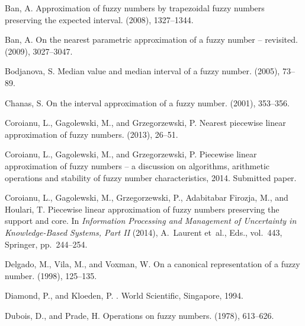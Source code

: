 \documentclass[11pt]{article}\usepackage[]{graphicx}\usepackage[]{color}
\begin{document}
\begin{thebibliography}{10}

{\sc Ban, A.}
\newblock Approximation of fuzzy numbers by trapezoidal fuzzy numbers
  preserving the expected interval.
 (2008), 1327--1344.

{\sc Ban, A.}
\newblock On the nearest parametric approximation of a fuzzy number --
  revisited.
 (2009), 3027--3047.

{\sc Bodjanova, S.}
\newblock Median value and median interval of a fuzzy number.
 (2005), 73--89.

{\sc Chanas, S.}
\newblock On the interval approximation of a fuzzy number.
 (2001), 353--356.

{\sc Coroianu, L., Gagolewski, M., and Grzegorzewski, P.}
\newblock Nearest piecewise linear approximation of fuzzy numbers.
 (2013), 26--51.

{\sc Coroianu, L., Gagolewski, M., and Grzegorzewski, P.}
\newblock Piecewise linear approximation of fuzzy numbers --
a discussion on algorithms, arithmetic operations and stability of fuzzy number characteristics, 2014.
\newblock Submitted paper.

{\sc Coroianu, L., Gagolewski, M., Grzegorzewski, P., {Adabitabar Firozja}, M.,
  and Houlari, T.}
\newblock Piecewise linear approximation of fuzzy numbers preserving the
  support and core.
\newblock In {\em Information Processing and Management of Uncertainty in
  Knowledge-Based Systems, Part II\/} (2014), A.~Laurent et~al., Eds.,
  vol.~443, Springer, pp.~244--254.

{\sc Delgado, M., Vila, M., and Voxman, W.}
\newblock On a canonical representation of a fuzzy number.
 (1998), 125--135.

{\sc Diamond, P., and Kloeden, P.}
.
\newblock World Scientific, Singapore, 1994.

{\sc Dubois, D., and Prade, H.}
\newblock Operations on fuzzy numbers.
 (1978), 613--626.


\end{thebibliography}
\end{document}
